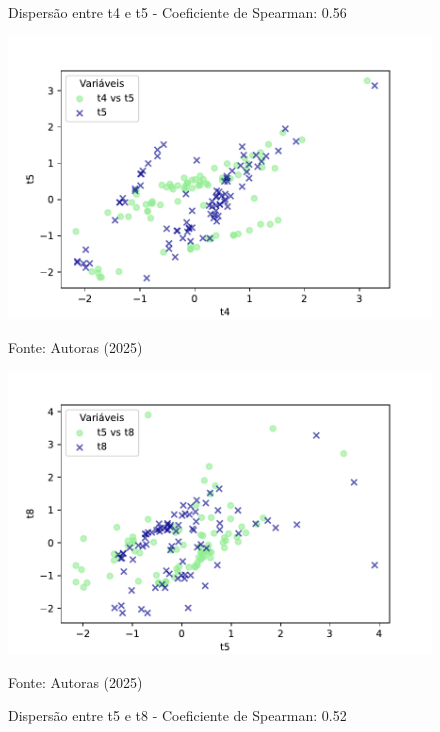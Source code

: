 \begin{figure}[h]
    \captionsetup{font=footnotesize, justification=centering, labelsep=period, position=above}
    \centering
    \begin{minipage}[b]{0.45\linewidth}
        \caption{Dispersão entre t4 e t5 - Coeficiente de Spearman: 0.56}
        \label{fig:t4-t5}
        \centering
        \includegraphics[scale=0.35]{figuras/Spearman/t4-t5.pdf}
        \vspace{0.3cm}
        \begin{minipage}{\linewidth}
            \centering
            \scriptsize{Fonte: Autoras (2025)}
        \end{minipage}
    \end{minipage}
    \hspace{0.05\linewidth}
    \begin{minipage}[b]{0.45\linewidth}
        \caption{Dispersão entre t5 e t8 - Coeficiente de Spearman: 0.52}
        \label{fig:t5-t8}
        \centering
        \includegraphics[scale=0.35]{figuras/Spearman/t5-t8.pdf}
        \vspace{0.3cm}
        \begin{minipage}{\linewidth}
            \centering
            \scriptsize{Fonte: Autoras (2025)}
        \end{minipage}
    \end{minipage}
\end{figure}
\FloatBarrier

